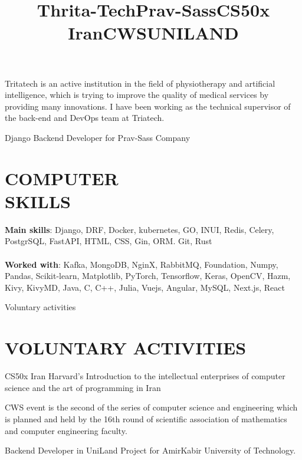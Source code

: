 \documentclass[margin]{res}
\begin{document}
\begin{resume}
\title{\textbf{Thrita-Tech}}
\begin{position}
Tritatech is an active institution in the field of physiotherapy and artificial intelligence, which is trying to improve the quality of medical services by providing many innovations. I have been working as the technical supervisor of the back-end and DevOps team at Triatech.
\end{position}

\title{\textbf{Prav-Sass}}
\begin{position}
Django Backend Developer for Prav-Sass Company
\end{position}


\section{COMPUTER\\SKILLS}


\textbf{Main skills}: Django, DRF, Docker, kubernetes, GO, INUI, Redis, Celery, PostgrSQL, FastAPI, HTML, CSS, Gin, ORM. Git, Rust
\\
\\
\textbf{Worked with}: Kafka, MongoDB, NginX, RabbitMQ, Foundation, Numpy, Pandas, Scikit-learn, Matplotlib, PyTorch, Tensorflow, Keras, OpenCV, Hazm, Kivy, KivyMD, Java, C, C++, Julia, Vuejs, Angular, MySQL, Next.js, React

Voluntary activities
\section{VOLUNTARY ACTIVITIES}
\par

\title{\textbf{CS50x Iran}}
\begin{position}
CS50x Iran Harvard's Introduction to the intellectual enterprises of computer science and the art of programming in Iran
\end{position}

\title{\textbf{CWS}}
\begin{position}
CWS event is the second of the series of computer science and engineering which is planned and held by the 16th round of scientific association of mathematics and computer engineering faculty.
\end{position}
\title{\textbf{UNILAND}}
\begin{position}
Backend Developer in UniLand Project for AmirKabir University of Technology.
\end{position}

\end{resume}
\end{document}

